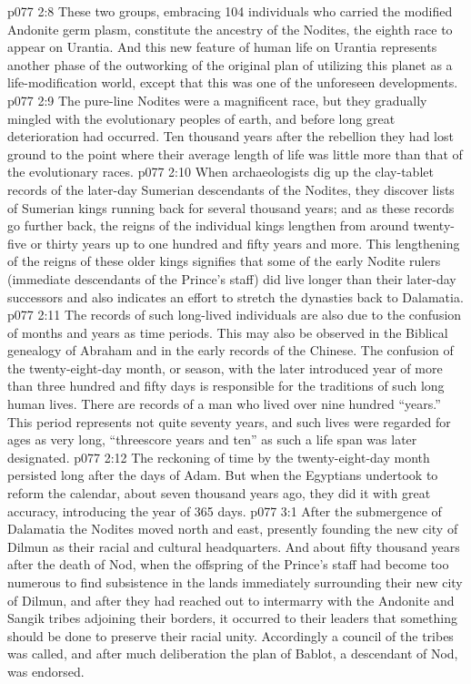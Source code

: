\vs p077 2:8 These two groups, embracing 104 individuals who carried the modified Andonite germ plasm, constitute the ancestry of the Nodites, the eighth race to appear on Urantia. And this new feature of human life on Urantia represents another phase of the outworking of the original plan of utilizing this planet as a life\hyp{}modification world, except that this was one of the unforeseen developments.
\pc \vs p077 2:9 The pure\hyp{}line Nodites were a magnificent race, but they gradually mingled with the evolutionary peoples of earth, and before long great deterioration had occurred. Ten thousand years after the rebellion they had lost ground to the point where their average length of life was little more than that of the evolutionary races.
\vs p077 2:10 When archaeologists dig up the clay\hyp{}tablet records of the later\hyp{}day Sumerian descendants of the Nodites, they discover lists of Sumerian kings running back for several thousand years; and as these records go further back, the reigns of the individual kings lengthen from around twenty\hyp{}five or thirty years up to one hundred and fifty years and more. This lengthening of the reigns of these older kings signifies that some of the early Nodite rulers (immediate descendants of the Prince’s staff) did live longer than their later\hyp{}day successors and also indicates an effort to stretch the dynasties back to Dalamatia.\plusone
\vs p077 2:11 The records of such long\hyp{}lived individuals are also due to the confusion of months and years as time periods. This may also be observed in the Biblical genealogy of Abraham and in the early records of the Chinese. The confusion of the twenty\hyp{}eight\hyp{}day month, or season, with the later introduced year of more than three hundred and fifty days is responsible for the traditions of such long human lives. There are records of a man who lived over nine hundred “years.” This period represents not quite seventy years, and such lives were regarded for ages as very long, “threescore years and ten” as such a life span was later designated.
\vs p077 2:12 The reckoning of time by the twenty\hyp{}eight\hyp{}day month persisted long after the days of Adam. But when the Egyptians undertook to reform the calendar, about seven thousand years ago, they did it with great accuracy, introducing the year of 365 days.
\vs p077 3:1 After the submergence of Dalamatia the Nodites moved north and east, presently founding the new city of Dilmun as their racial and cultural headquarters. And about fifty thousand years after the death of Nod, when the offspring of the Prince’s staff had become too numerous to find subsistence in the lands immediately surrounding their new city of Dilmun, and after they had reached out to intermarry with the Andonite and Sangik tribes adjoining their borders, it occurred to their leaders that something should be done to preserve their racial unity. Accordingly a council of the tribes was called, and after much deliberation the plan of Bablot, a descendant of Nod, was endorsed.
